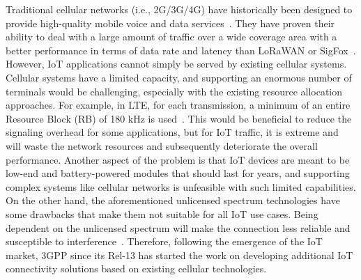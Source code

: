 \documentclass[]{IEEEtran}
\begin{document}
Traditional cellular networks (i.e., 2G/3G/4G) have historically been designed to provide high-quality mobile voice and data services~\cite{noauthor_how_nodate}.
They have proven their ability to deal with a large amount of traffic over a wide coverage area with a better performance in terms of data rate and latency than LoRaWAN or SigFox~\cite{hwang_survey_2019}.
However, IoT applications cannot simply be served by existing cellular systems.
Cellular systems have a limited capacity, and supporting an enormous number of terminals would be challenging, especially with the existing resource allocation approaches.
For example, in LTE, for each transmission, a minimum of an entire Resource Block (RB) of 180 kHz is used~\cite{accurso_exploring_2021}.
This would be beneficial to reduce the signaling overhead for some applications, but for IoT traffic, it is extreme and will waste the network resources and subsequently deteriorate the overall performance.
Another aspect of the problem is that IoT devices are meant to be low-end and battery-powered modules that should last for years, and supporting complex systems like cellular networks is unfeasible with such limited capabilities.
On the other hand, the aforementioned unlicensed spectrum technologies have some drawbacks that make them not suitable for all IoT use cases.
Being dependent on the unlicensed spectrum will make the connection less reliable and susceptible to interference~\cite{hwang_survey_2019}.
Therefore, following the emergence of the IoT market, 3GPP since its Rel-13 has started the work on developing additional IoT connectivity solutions based on existing cellular technologies.
\end{document}

